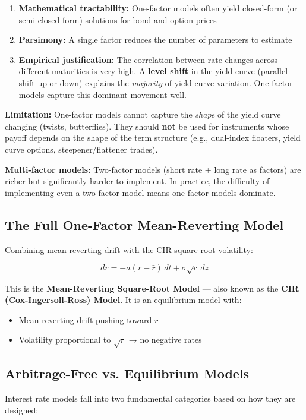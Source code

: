 \documentclass[12pt,openany]{book}
\theoremstyle{definition}
\theoremstyle{remark}
\begin{document}
\begin{enumerate}
\item \textbf{Mathematical tractability:} One-factor models often yield closed-form (or semi-closed-form) solutions for bond and option prices


\item \textbf{Parsimony:} A single factor reduces the number of parameters to estimate


\item \textbf{Empirical justification:} The correlation between rate changes across different maturities is very high. A \textbf{level shift} in the yield curve (parallel shift up or down) explains the \emph{majority} of yield curve variation. One-factor models capture this dominant movement well.


\end{enumerate}
\textbf{Limitation:} One-factor models cannot capture the \emph{shape} of the yield curve changing (twists, butterflies). They should \textbf{not} be used for instruments whose payoff depends on the shape of the term structure (e.g., dual-index floaters, yield curve options, steepener/flattener trades).

\textbf{Multi-factor models:} Two-factor models (short rate + long rate as factors) are richer but significantly harder to implement. In practice, the difficulty of implementing even a two-factor model means one-factor models dominate.

\medskip
\subsection{The Full One-Factor Mean-Reverting Model}
Combining mean-reverting drift with the CIR square-root volatility:

\[
\boxed{dr = -a(r - \bar{r}) \, dt + \sigma\sqrt{r} \, dz}
\]

This is the \textbf{Mean-Reverting Square-Root Model} --- also known as the \textbf{CIR (Cox-Ingersoll-Ross) Model}. It is an equilibrium model with:

\begin{itemize}
\item Mean-reverting drift pushing toward $\bar{r}$


\item Volatility proportional to $\sqrt{r}$ → no negative rates


\end{itemize}
\medskip
\subsection{Arbitrage-Free vs. Equilibrium Models}
Interest rate models fall into two fundamental categories based on how they are designed:
\end{document}
